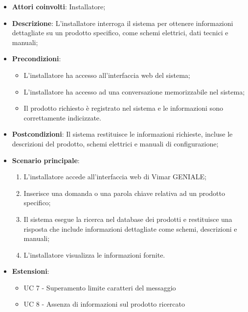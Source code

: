 \begin{itemize}
    \item \textbf{Attori coinvolti}: Installatore;
    \item \textbf{Descrizione}: L’installatore interroga il sistema per ottenere informazioni dettagliate su un prodotto specifico, come schemi elettrici, dati tecnici e manuali;
    \item \textbf{Precondizioni}: 
        \begin{itemize}
            \item L’installatore ha accesso all’interfaccia web del sistema;
            \item L’installatore ha accesso ad una conversazione memorizzabile nel sistema;
            \item Il prodotto richiesto è registrato nel sistema e le informazioni sono correttamente indicizzate.
        \end{itemize}
    \item \textbf{Postcondizioni}: Il sistema restituisce le informazioni richieste, incluse le descrizioni del prodotto, schemi elettrici e manuali di configurazione;
    \item \textbf{Scenario principale}:
    \begin{enumerate}
    \item L’installatore accede all’interfaccia web di Vimar GENIALE;
    \item Inserisce una domanda o una parola chiave relativa ad un prodotto specifico;
    \item Il sistema esegue la ricerca nel database dei prodotti e restituisce una risposta che include informazioni dettagliate come schemi, descrizioni e manuali;
    \item L’installatore visualizza le informazioni fornite.
    \end{enumerate}
    \item \textbf{Estensioni}: 
        \begin{itemize}
            \item UC 7 - Superamento limite caratteri del messaggio
            \item UC 8 - Assenza di informazioni sul prodotto ricercato
        \end{itemize}
\end{itemize}

